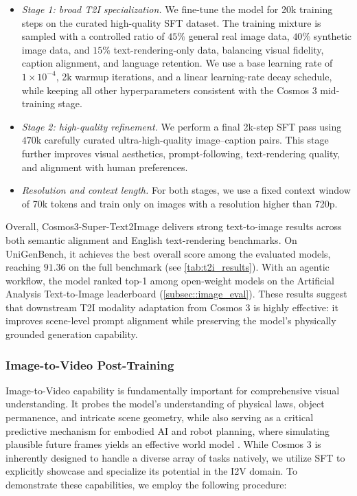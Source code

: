 \begin{itemize}
\item \textit{Stage 1: broad T2I specialization.} We fine-tune the model for 20k training steps on the curated high-quality SFT dataset. The training mixture is sampled with a controlled ratio of $45\%$ general real image data, $40\%$ synthetic image data, and $15\%$ text-rendering-only data, balancing visual fidelity, caption alignment, and language retention. We use a base learning rate of $1\times10^{-4}$, 2k warmup iterations, and a linear learning-rate decay schedule, while keeping all other hyperparameters consistent with the Cosmos 3 mid-training stage.

\item \textit{Stage 2: high-quality refinement.} We perform a final 2k-step SFT pass using $470$k carefully curated ultra-high-quality image--caption pairs. This stage further improves visual aesthetics, prompt-following, text-rendering quality, and alignment with human preferences.

\item \textit{Resolution and context length.} For both stages, we use a fixed context window of 70k tokens and train only on images with a resolution higher than 720p.
\end{itemize}

Overall, Cosmos3-Super-Text2Image delivers strong text-to-image results across both semantic alignment and English text-rendering benchmarks. On UniGenBench, it achieves the best overall score among the evaluated models, reaching $91.36$ on the full benchmark (see \cref{tab:t2i_results}). With an agentic workflow, the model ranked top-1 among open-weight models on the Artificial Analysis Text-to-Image leaderboard (\cref{subsec::image_eval}). These results suggest that downstream T2I modality adaptation from Cosmos 3 is highly effective: it improves scene-level prompt alignment while preserving the model's physically grounded generation capability.


\subsubsection{Image-to-Video Post-Training}
\label{sec::i2v_post_train}

Image-to-Video capability is fundamentally important for comprehensive visual understanding. It probes the model's understanding of physical laws, object permanence, and intricate scene geometry, while also serving as a critical predictive mechanism for embodied AI and robot planning, where simulating plausible future frames yields an effective world model \citep{wiedemer2025video, chen2025largevideoplanner}. While Cosmos 3 is inherently designed to handle a diverse array of tasks natively, we utilize SFT to explicitly showcase and specialize its potential in the I2V domain. To demonstrate these capabilities, we employ the following procedure:

